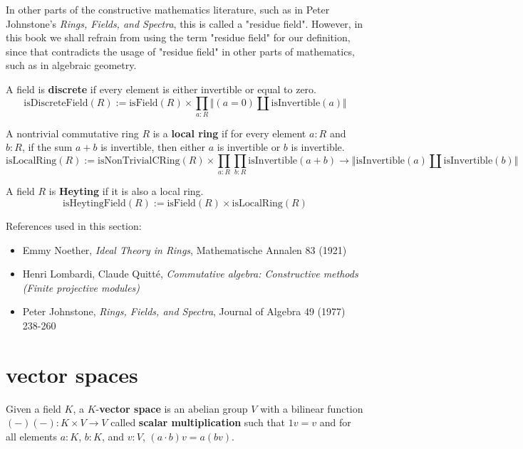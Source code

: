 \begin{remark}
In other parts of the constructive mathematics literature, such as in Peter Johnstone's \textit{Rings, Fields, and Spectra}, this is called a "residue field". However, in this book we shall refrain from using the term "residue field" for our definition, since that contradicts the usage of "residue field" in other parts of mathematics, such as in algebraic geometry. 
\end{remark}

\begin{definition}
A field is \textbf{discrete} if every element is either invertible or equal to zero. 
$$\mathrm{isDiscreteField}(R) := \mathrm{isField}(R) \times \prod_{a:R} \Vert(a = 0) \amalg \mathrm{isInvertible}(a)\Vert$$ 
\end{definition}

\begin{definition}
A nontrivial commutative ring $R$ is a \textbf{local ring} if for every element $a:R$ and $b:R$, if the sum $a + b$ is invertible, then either $a$ is invertible or $b$ is invertible. 
$$\mathrm{isLocalRing}(R) := \mathrm{isNonTrivialCRing}(R) \times \prod_{a:R} \prod_{b:R} \mathrm{isInvertible}(a + b) \to \Vert\mathrm{isInvertible}(a) \amalg \mathrm{isInvertible}(b)\Vert$$ 
\end{definition}

\begin{definition}
A field $R$ is \textbf{Heyting} if it is also a local ring. 
$$\mathrm{isHeytingField}(R) := \mathrm{isField}(R) \times \mathrm{isLocalRing}(R)$$ 
\end{definition}

References used in this section: 
\begin{itemize}
\item Emmy Noether, \textit{Ideal Theory in Rings}, Mathematische Annalen 83 (1921)
\item Henri Lombardi, Claude Quitté, \textit{Commutative algebra: Constructive methods (Finite projective modules)}
\item Peter Johnstone, \textit{Rings, Fields, and Spectra}, Journal of Algebra 49 (1977) 238-260
\end{itemize}

\section{vector spaces}

\begin{definition}
Given a field $K$, a $K$-\textbf{vector space} is an abelian group $V$ with a bilinear function $(-)(-):K \times V \to V$ called \textbf{scalar multiplication} such that $1 v = v$ and for all elements $a:K$, $b:K$, and $v:V$, $(a \cdot b) v = a (b v)$. 
\end{definition}

